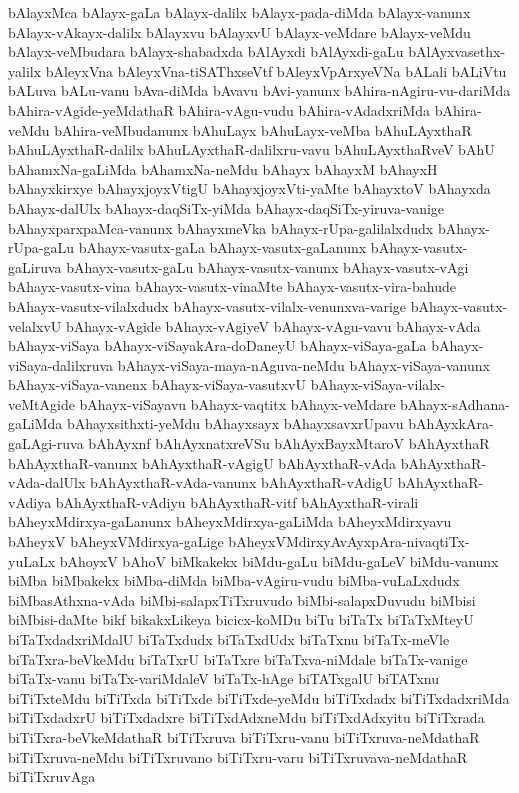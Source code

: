 {bAlayxMca
bAlayx-gaLa
bAlayx-dalilx
bAlayx-pada-diMda
bAlayx-vanunx
bAlayx-vAkayx-dalilx
bAlayxvu
bAlayxvU
bAlayx-veMdare
bAlayx-veMdu
bAlayx-veMbudara
bAlayx-shabadxda
bAlAyxdi
bAlAyxdi-gaLu
bAlAyxvasethx-yalilx
bAleyxVna
bAleyxVna-tiSAThxseVtf
bAleyxVpArxyeVNa
bALali
bALiVtu
bALuva
bALu-vanu
bAva-diMda
bAvavu
bAvi-yanunx
bAhira-nAgiru-vu-dariMda
bAhira-vAgide-yeMdathaR
bAhira-vAgu-vudu
bAhira-vAdadxriMda
bAhira-veMdu
bAhira-veMbudanunx
bAhuLayx
bAhuLayx-veMba
bAhuLAyxthaR
bAhuLAyxthaR-dalilx
bAhuLAyxthaR-dalilxru-vavu
bAhuLAyxthaRveV
bAhU
bAhamxNa-gaLiMda
bAhamxNa-neMdu
bAhayx
bAhayxM
bAhayxH
bAhayxkirxye
bAhayxjoyxVtigU
bAhayxjoyxVti-yaMte
bAhayxtoV
bAhayxda
bAhayx-dalUlx
bAhayx-daqSiTx-yiMda
bAhayx-daqSiTx-yiruva-vanige
bAhayxparxpaMca-vanunx
bAhayxmeVka
bAhayx-rUpa-galilalxdudx
bAhayx-rUpa-gaLu
bAhayx-vasutx-gaLa
bAhayx-vasutx-gaLanunx
bAhayx-vasutx-gaLiruva
bAhayx-vasutx-gaLu
bAhayx-vasutx-vanunx
bAhayx-vasutx-vAgi
bAhayx-vasutx-vina
bAhayx-vasutx-vinaMte
bAhayx-vasutx-vira-bahude
bAhayx-vasutx-vilalxdudx
bAhayx-vasutx-vilalx-venunxva-varige
bAhayx-vasutx-velalxvU
bAhayx-vAgide
bAhayx-vAgiyeV
bAhayx-vAgu-vavu
bAhayx-vAda
bAhayx-viSaya
bAhayx-viSayakAra-doDaneyU
bAhayx-viSaya-gaLa
bAhayx-viSaya-dalilxruva
bAhayx-viSaya-maya-nAguva-neMdu
bAhayx-viSaya-vanunx
bAhayx-viSaya-vanenx
bAhayx-viSaya-vasutxvU
bAhayx-viSaya-vilalx-veMtAgide
bAhayx-viSayavu
bAhayx-vaqtitx
bAhayx-veMdare
bAhayx-sAdhana-gaLiMda
bAhayxsithxti-yeMdu
bAhayxsayx
bAhayxsavxrUpavu
bAhAyxkAra-gaLAgi-ruva
bAhAyxnf
bAhAyxnatxreVSu
bAhAyxBayxMtaroV
bAhAyxthaR
bAhAyxthaR-vanunx
bAhAyxthaR-vAgigU
bAhAyxthaR-vAda
bAhAyxthaR-vAda-dalUlx
bAhAyxthaR-vAda-vanunx
bAhAyxthaR-vAdigU
bAhAyxthaR-vAdiya
bAhAyxthaR-vAdiyu
bAhAyxthaR-vitf
bAhAyxthaR-virali
bAheyxMdirxya-gaLanunx
bAheyxMdirxya-gaLiMda
bAheyxMdirxyavu
bAheyxV
bAheyxVMdirxya-gaLige
bAheyxVMdirxyAvAyxpAra-nivaqtiTx-yuLaLx
bAhoyxV
bAhoV
biMkakekx
biMdu-gaLu
biMdu-gaLeV
biMdu-vanunx
biMba
biMbakekx
biMba-diMda
biMba-vAgiru-vudu
biMba-vuLaLxdudx
biMbasAthxna-vAda
biMbi-salapxTiTxruvudo
biMbi-salapxDuvudu
biMbisi
biMbisi-daMte
bikf
bikakxLikeya
bicicx-koMDu
biTu
biTaTx
biTaTxMteyU
biTaTxdadxriMdalU
biTaTxdudx
biTaTxdUdx
biTaTxnu
biTaTx-meVle
biTaTxra-beVkeMdu
biTaTxrU
biTaTxre
biTaTxva-niMdale
biTaTx-vanige
biTaTx-vanu
biTaTx-variMdaleV
biTaTx-hAge
biTATxgalU
biTATxnu
biTiTxteMdu
biTiTxda
biTiTxde
biTiTxde-yeMdu
biTiTxdadx
biTiTxdadxriMda
biTiTxdadxrU
biTiTxdadxre
biTiTxdAdxneMdu
biTiTxdAdxyitu
biTiTxrada
biTiTxra-beVkeMdathaR
biTiTxruva
biTiTxru-vanu
biTiTxruva-neMdathaR
biTiTxruva-neMdu
biTiTxruvano
biTiTxru-varu
biTiTxruvava-neMdathaR
biTiTxruvAga
}
